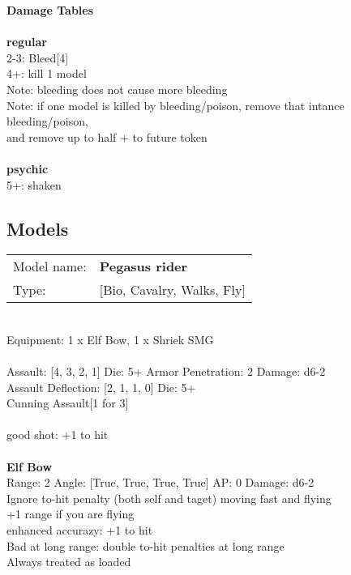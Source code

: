 {\bf Damage Tables} \\
\ \\ {\bf regular } \\
2-3: Bleed[4] \\
4+: kill 1 model \\
Note: bleeding does not cause more bleeding \\
Note: if one model is killed by bleeding/poison, remove that intance bleeding/poison, \\ and remove up to half + to future token \\
\ \\ {\bf psychic } \\
5+: shaken \\


\pagebreak

\subsection{ Models }

\begin{tabular}{ll}
Model name: & {\bf Pegasus rider } \\
Type: & [Bio, Cavalry, Walks, Fly] \\
\end{tabular}
\ \\
Equipment: 1 x Elf Bow, 1 x Shriek SMG \\
\ \\
Assault: [4, 3, 2, 1] Die: 5+ Armor Penetration: 2 Damage: d6-2 \\
Assault Deflection: [2, 1, 1, 0] Die: 5+\\
\indent Cunning Assault[1 for 3]\\ 
 
\ \\
good shot: +1 to hit\\ 

\ \\
{\bf Elf Bow } \\



Range: 2  Angle: [True, True, True, True] AP: 0 Damage: d6-2 \\
Ignore to-hit penalty (both self and taget) moving fast and flying\\ 
+1 range if you are flying\\ 
enhanced accurazy: +1 to hit\\ 
Bad at long range: double to-hit penalties at long range\\ 
Always treated as loaded\\ 




